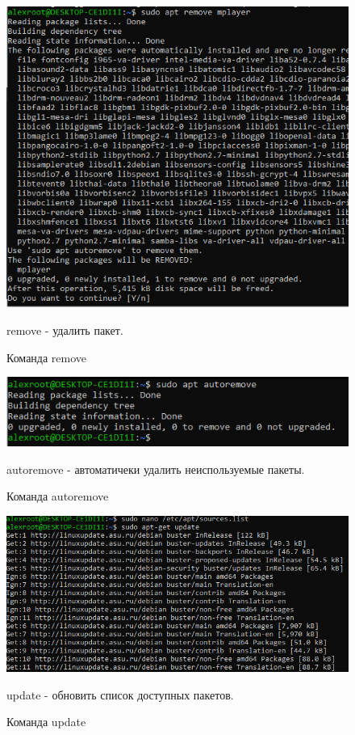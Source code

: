 \documentclass[a4paper,14pt]{extarticle}
\begin{document}
\begin{figure}[h!]
\centering
\includegraphics[width=1\linewidth]{remove.png}
\caption{Команда remove}
\label{fig:mpr}
remove - удалить пакет. 
\end{figure}

\begin{figure}[h!]
\centering
\includegraphics[width=1\linewidth]{autoremove.png}
\caption{Команда autoremove}
\label{fig:mpr}
autoremove - автоматичеки удалить неиспользуемые пакеты. 
\end{figure}

\begin{figure}[h!]
\centering
\includegraphics[width=1\linewidth]{update.png}
\caption{Команда update}
\label{fig:mpr}
update - обновить список доступных пакетов. 
\end{figure}
\end{document}
